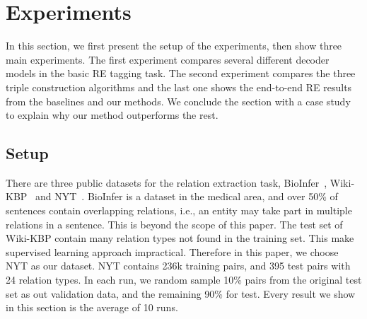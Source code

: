 \section{Experiments}
\label{sec:eval}
In this section, we first present the setup of the experiments, then show
three main experiments. The first experiment compares several different
decoder models in the basic RE tagging task. The second experiment compares 
the three triple construction algorithms and the last one shows the end-to-end
RE results from the baselines and our methods. We conclude the
section with a case study to explain why our method outperforms the rest.

\subsection{Setup}
There are three public datasets for the relation extraction task,
BioInfer~\cite{}, Wiki-KBP~\cite{} and NYT~\cite{}. BioInfer is a dataset in the medical area, and over
50\% of sentences contain overlapping relations, i.e., an entity may take part
in multiple relations in a sentence. This is beyond the scope of this paper.
The test set of Wiki-KBP contain many relation types not found in the 
training set. This make supervised learning approach impractical. Therefore
in this paper, we choose NYT as our dataset.
NYT contains 236k training pairs, and 395 test pairs with 24 relation types. 
%
In each run, we random sample 10\% pairs from the
original test set as out validation data, and the remaining 90\%  for
test. 
Every result we show in this section is the average of 10 runs.

